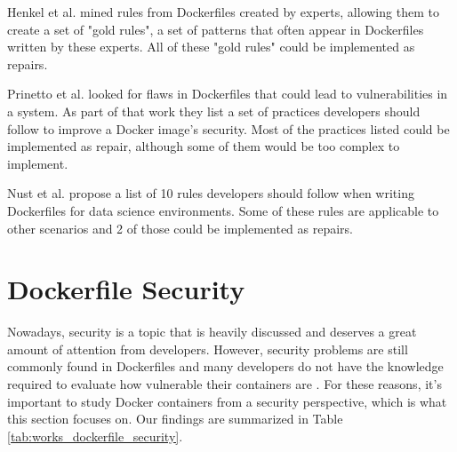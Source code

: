 Henkel et al. \cite{henkelLearningUnderstandingSupporting2020} mined rules from Dockerfiles created by experts, allowing them to create a set of "gold rules", a set of patterns that often appear in Dockerfiles written by these experts. All of these "gold rules" could be implemented as repairs.

Prinetto et al. \cite{prinettoSecurityMisconfigurationsDetection} looked for flaws in Dockerfiles that could lead to vulnerabilities in a system. As part of that work they list a set of practices developers should follow to improve a Docker image's security. Most of the practices listed could be implemented as repair, although some of them would be too complex to implement.

Nust et al. \cite{nustTenSimpleRules2020} propose a list of 10 rules developers should follow when writing Dockerfiles for data science environments. Some of these rules are applicable to other scenarios and 2 of those could be implemented as repairs.

\section{Dockerfile Security} \label{sec:dockerfile_security}

Nowadays, security is a topic that is heavily discussed and deserves a great amount of attention from developers. However, security problems are still commonly found in Dockerfiles \cite{doanDAVSDockerfileAnalysis2022} and many developers do not have the knowledge required to evaluate how vulnerable their containers are \cite{zareiInvestigatingInnerWorkings2022}. For these reasons, it's important to study Docker containers from a security perspective, which is what this section focuses on. Our findings are summarized in Table \ref{tab:works_dockerfile_security}.

